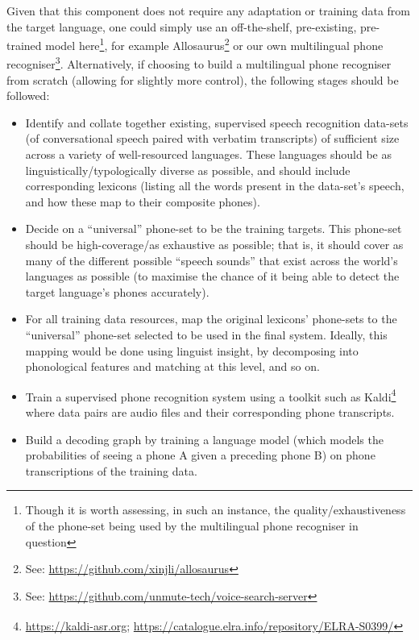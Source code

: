 \documentclass[10pt,twoside,openright]{report}
\begin{document}
Given that this component does not require any adaptation or training data from the target language, one could simply use an off-the-shelf, pre-existing, pre-trained model here\footnote{Though it is worth assessing, in such an instance, the quality/exhaustiveness of the phone-set being used by the multilingual phone recogniser in question}, for example Allosaurus\footnote{See: \url{https://github.com/xinjli/allosaurus}} or our own multilingual phone recogniser\footnote{See: \url{https://github.com/unmute-tech/voice-search-server}}.
Alternatively, if choosing to build a multilingual phone recogniser from scratch (allowing for slightly more control), the following stages should be followed:
\begin{itemize}
    \item Identify and collate together existing, supervised speech recognition data-sets (of conversational speech paired with verbatim transcripts) of sufficient size across a variety of well-resourced languages. These languages should be as linguistically/typologically diverse as possible, and should include corresponding lexicons (listing all the words present in the data-set's speech, and how these map to their composite phones).
    \item Decide on a ``universal'' phone-set to be the training targets. This phone-set should be high-coverage/as exhaustive as possible; that is, it should cover as many of the different possible ``speech sounds'' that exist across the world's languages as possible (to maximise the chance of it being able to detect the target language's phones accurately).
    \item For all training data resources, map the original lexicons' phone-sets to the ``universal'' phone-set selected to be used in the final system. Ideally, this mapping would be done using linguist insight, by decomposing into phonological features and matching at this level, and so on.
    \item Train a supervised phone recognition system using a toolkit such as Kaldi\footnote{\label{foot:globalphone}\url{https://kaldi-asr.org}; \textsuperscript{}\href{https://catalogue.elra.info/en-us/repository/browse/ELRA-S0399/}{https://catalogue.elra.info/repository/ELRA-S0399/}} where data pairs are audio files and their corresponding phone transcripts.
        \item Build a decoding graph by training a language model (which models the probabilities of seeing a phone A given a preceding phone B) on phone transcriptions of the training data.
\end{itemize}
\end{document}
